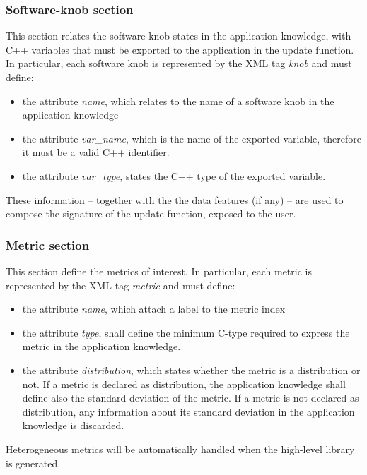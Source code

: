 \subsubsection*{Software-knob section}

This section relates the software-knob states in the application knowledge, with C++ variables that must be exported to the application in the update function.
In particular, each software knob is represented by the XML tag \textit{knob} and must define:
\begin{itemize}
	\item the attribute \textit{name}, which relates to the name of a software knob in the application knowledge
	\item the attribute \textit{var\_name}, which is the name of the exported variable, therefore it must be a valid C++ identifier.
	\item the attribute \textit{var\_type}, states the C++ type of the exported variable.
\end{itemize}

These information -- together with the the data features (if any) --  are used to compose the signature of the update function, exposed to the user.

\subsubsection*{Metric section}

This section define the metrics of interest.
In particular, each metric is represented by the XML tag \textit{metric} and must define:
\begin{itemize}
	\item the attribute \textit{name}, which attach a label to the metric index
	\item the attribute \textit{type}, shall define the minimum C-type required to express the metric in the application knowledge.
	\item the attribute \textit{distribution}, which states whether the metric is a distribution or not. If a metric is declared as distribution, the application knowledge shall define also the standard deviation of the metric. If a metric is not declared as distribution, any information about its standard deviation in the application knowledge is discarded.
\end{itemize}

Heterogeneous metrics will be automatically handled when the high-level library is generated.



